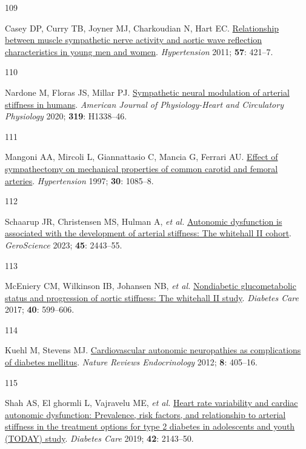 \documentclass[
  a4paper,
  headsepline=true,
  open=left]{scrbook}
\newlength{\cslhangindent}
\newlength{\csllabelwidth}
\newlength{\cslentryspacingunit} %
\newenvironment{CSLReferences}[2] %
 {%
  \setlength{\parindent}{0pt}
  \ifodd #1
  \let\oldpar\par
  \def\par{\hangindent=\cslhangindent\oldpar}
  \fi
  \setlength{\parskip}{#2\cslentryspacingunit}
 }%
 {}
\newcommand{\CSLLeftMargin}[1]{\parbox[t]{\csllabelwidth}{#1}}
\newcommand{\CSLRightInline}[1]{\parbox[t]{\linewidth - \csllabelwidth}{#1}\break}
\begin{document}
\begin{CSLReferences}{0}{0}
\leavevmode{}%
\CSLLeftMargin{109 }%
\CSLRightInline{Casey DP, Curry TB, Joyner MJ, Charkoudian N, Hart EC.
\href{https://doi.org/10.1161/HYPERTENSIONAHA.110.164517}{Relationship
between muscle sympathetic nerve activity and aortic wave reflection
characteristics in young men and women}. \emph{Hypertension} 2011;
\textbf{57}: 421--7.}

\leavevmode{}%
\CSLLeftMargin{110 }%
\CSLRightInline{Nardone M, Floras JS, Millar PJ.
\href{https://doi.org/10.1152/ajpheart.00734.2020}{Sympathetic neural
modulation of arterial stiffness in humans}. \emph{American Journal of
Physiology-Heart and Circulatory Physiology} 2020; \textbf{319}:
H1338--46.}

\leavevmode{}%
\CSLLeftMargin{111 }%
\CSLRightInline{Mangoni AA, Mircoli L, Giannattasio C, Mancia G, Ferrari
AU. \href{https://doi.org/10.1161/01.HYP.30.5.1085}{Effect of
sympathectomy on mechanical properties of common carotid and femoral
arteries}. \emph{Hypertension} 1997; \textbf{30}: 1085--8.}

\leavevmode{}%
\CSLLeftMargin{112 }%
\CSLRightInline{Schaarup JR, Christensen MS, Hulman A, \emph{et al.}
\href{https://doi.org/10.1007/s11357-023-00762-0}{Autonomic dysfunction
is associated with the development of arterial stiffness: The whitehall
II cohort}. \emph{GeroScience} 2023; \textbf{45}: 2443--55.}

\leavevmode{}%
\CSLLeftMargin{113 }%
\CSLRightInline{McEniery CM, Wilkinson IB, Johansen NB, \emph{et al.}
\href{https://doi.org/10.2337/dc16-1773}{Nondiabetic glucometabolic
status and progression of aortic stiffness: The whitehall II study}.
\emph{Diabetes Care} 2017; \textbf{40}: 599--606.}

\leavevmode{}%
\CSLLeftMargin{114 }%
\CSLRightInline{Kuehl M, Stevens MJ.
\href{https://doi.org/10.1038/nrendo.2012.21}{Cardiovascular autonomic
neuropathies as complications of diabetes mellitus}. \emph{Nature
Reviews Endocrinology} 2012; \textbf{8}: 405--16.}

\leavevmode{}%
\CSLLeftMargin{115 }%
\CSLRightInline{Shah AS, El ghormli L, Vajravelu ME, \emph{et al.}
\href{https://doi.org/10.2337/dc19-0993}{Heart rate variability and
cardiac autonomic dysfunction: Prevalence, risk factors, and
relationship to arterial stiffness in the treatment options for type 2
diabetes in adolescents and youth (TODAY) study}. \emph{Diabetes Care}
2019; \textbf{42}: 2143--50.}


\end{CSLReferences}
\end{document}
